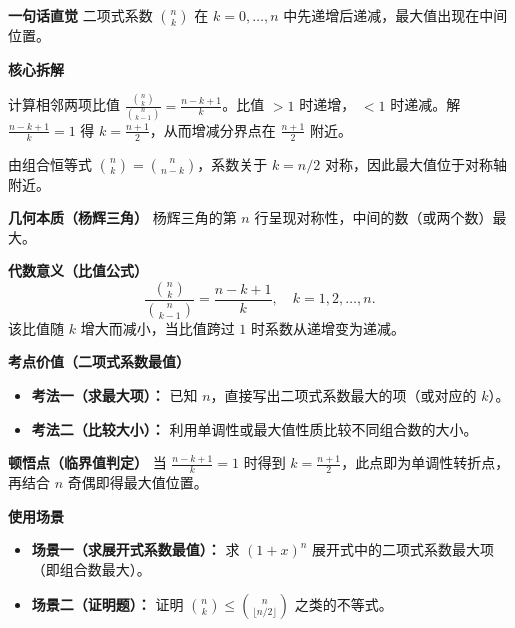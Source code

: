 \begin{explanationbox}
	\textbf{\textcolor{CExplanation}{一句话直觉}}
	二项式系数 $\binom{n}{k}$ 在 $k=0,\dots,n$ 中先递增后递减，最大值出现在中间位置。

	\medskip
	\textbf{\textcolor{CExplanation}{核心拆解}}
	\begin{description}[style=nextline, leftmargin=2.8em, labelsep=0.5em, itemsep=0.45em]
		\item[\textbf{要点一（比值单调性）：}]
			计算相邻两项比值 $\frac{\binom{n}{k}}{\binom{n}{k-1}} = \frac{n-k+1}{k}$。比值 $>1$ 时递增， $<1$ 时递减。解 $\frac{n-k+1}{k}=1$ 得 $k=\frac{n+1}{2}$，从而增减分界点在 $\frac{n+1}{2}$ 附近。
		\item[\textbf{要点二（对称性）：}]
			由组合恒等式 $\binom{n}{k}=\binom{n}{n-k}$，系数关于 $k=n/2$ 对称，因此最大值位于对称轴附近。
	\end{description}

	\medskip
	\textbf{\textcolor{CExplanation}{几何本质（杨辉三角）}}
	杨辉三角的第 $n$ 行呈现对称性，中间的数（或两个数）最大。

	\medskip
	\textbf{\textcolor{CExplanation}{代数意义（比值公式）}}
	\[
		\frac{\binom{n}{k}}{\binom{n}{k-1}} = \frac{n-k+1}{k},\quad k=1,2,\dots,n.
	\]
	该比值随 $k$ 增大而减小，当比值跨过 $1$ 时系数从递增变为递减。

	\medskip
	\textbf{\textcolor{CExplanation}{考点价值（二项式系数最值）}}
	\begin{itemize}[leftmargin=*, itemsep=0.5em, topsep=0.4em]
		\item \textbf{考法一（求最大项）：} 已知 $n$，直接写出二项式系数最大的项（或对应的 $k$）。
		\item \textbf{考法二（比较大小）：} 利用单调性或最大值性质比较不同组合数的大小。
	\end{itemize}

	\medskip
	\textbf{\textcolor{CExplanation}{顿悟点（临界值判定）}}
	当 $\frac{n-k+1}{k}=1$ 时得到 $k=\frac{n+1}{2}$，此点即为单调性转折点，再结合 $n$ 奇偶即得最大值位置。

	\medskip
	\textbf{\textcolor{CExplanation}{使用场景}}
	\begin{itemize}[leftmargin=*, itemsep=0.5em, topsep=0.4em]
		\item \textbf{场景一（求展开式系数最值）：} 求 $(1+x)^n$ 展开式中的二项式系数最大项（即组合数最大）。
		\item \textbf{场景二（证明题）：} 证明 $\binom{n}{k} \le \binom{n}{\lfloor n/2\rfloor}$ 之类的不等式。
	\end{itemize}

\end{explanationbox}
